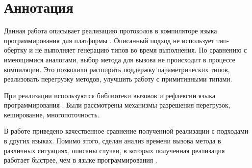 \section*{Аннотация}

Данная работа описывает реализацию протоколов в компиляторе языка программирования  для платформы . Описанный подход не использует тип-обёртку и не выполняет генерацию типов во время выполнения. По сравнению с имеющимися аналогами, выбор метода для вызова не происходит в процессе компиляции. Это позволило расширить поддержку параметрических типов, реализовать перегрузку методов, улучшить работу с примитивными типами.

При реализации используются библиотеки вызовов и рефлексии языка программирования . Были рассмотрены механизмы разрешения перегрузок, кеширование, многопоточность.

В работе приведено качественное сравнение полученной реализации с подходами в других языках. Помимо этого, сделан анализ времени вызова метода в различных ситуациях, описаны случаи, в которых полученная реализация работает быстрее, чем в языке программирования .
